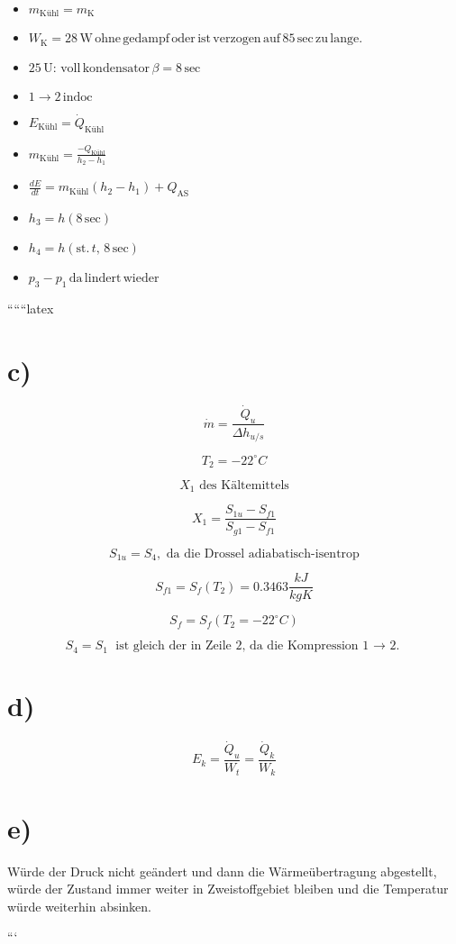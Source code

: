\begin{itemize}
    \item $m_{\text{Kühl}} = m_{\text{K}}$
    \item $W_{\text{K}} = 28 \, \text{W} \, \text{ohne} \, \text{gedampf} \, \text{oder} \, \text{ist} \, \text{verzogen} \, \text{auf} \, 85 \, \text{sec} \, \text{zu} \, \text{lange}.$
    \item $25 \, \text{U}: \, \text{voll} \, \text{kondensator} \, \beta = 8 \, \text{sec}$
    \item $1 \rightarrow 2 \, \text{indoc}$
    \item $E_{\text{Kühl}} = \dot{Q}_{\text{Kühl}}$
    \item $m_{\text{Kühl}} = \frac{-Q_{\text{Kühl}}}{h_2 - h_1}$
    \item $\frac{dE}{dt} = m_{\text{Kühl}} (h_2 - h_1) + Q_{\text{AS}}$
    \item $h_3 = h(8 \, \text{sec})$
    \item $h_4 = h(\text{st.} \, t, \, 8 \, \text{sec})$
    \item $p_3 - p_1 \, \text{da} \, \text{lindert} \, \text{wieder}$
\end{itemize}

``````latex


\section*{c)}

\[
\dot{m} = \frac{\dot{Q}_u}{\Delta h_{u/s}}
\]

\[
T_2 = -22^\circ C
\]

\[
X_1 \text{ des Kältemittels}
\]

\[
X_1 = \frac{S_{1u} - S_{f1}}{S_{g1} - S_{f1}}
\]

\[
S_{1u} = S_{4}, \text{ da die Drossel adiabatisch-isentrop}
\]

\[
S_{f1} = S_{f} (T_2) = 0.3463 \frac{kJ}{kgK}
\]

\[
S_{f} = S_{f} (T_2 = -22^\circ C)
\]

\[
S_{4} = S_{1} \text{ ist gleich der in Zeile 2, da die Kompression 1 $\rightarrow$ 2.}
\]

\section*{d)}

\[
E_k = \frac{\dot{Q}_u}{W_{t}} = \frac{\dot{Q}_k}{W_{k}}
\]

\section*{e)}

Würde der Druck nicht geändert und dann die Wärmeübertragung abgestellt, würde der Zustand immer weiter in Zweistoffgebiet bleiben und die Temperatur würde weiterhin absinken.

```